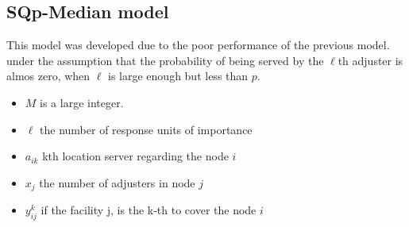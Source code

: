 
\subsection{SQp-Median model}
  
\begin{frame}
  This model was developed due to the poor performance of the previous model.
  under the assumption that the probability of being served by the $\ell$th 
  adjuster is almos zero, when $\ell$ is large enough but less than $p$.
  \begin{itemize}
  \item $M$ is a large integer.
  \item $\ell$ the number of response units of importance
  \item $a_{ik}$ kth location server regarding the node $i$
  \item $x_j$ the number of adjusters in node $j$
  \item $y_{ij}^k$ if the facility j, is the k-th to cover the node $i$
  \end{itemize}

\end{frame}

